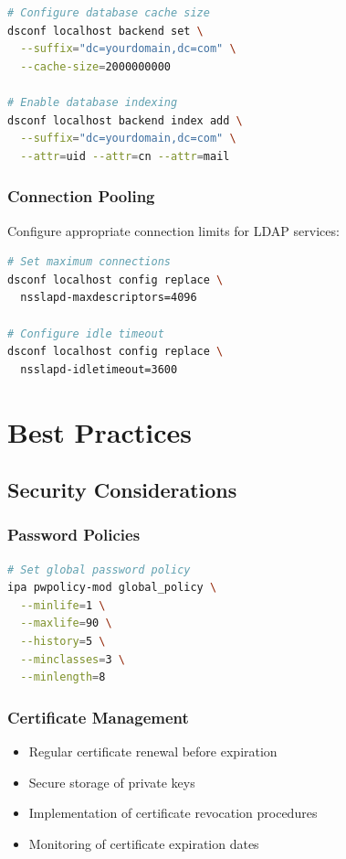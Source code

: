 \documentclass[12pt,a4paper]{report}
\begin{document}
\begin{lstlisting}[language=bash,caption=Database Performance Tuning]
# Configure database cache size
dsconf localhost backend set \
  --suffix="dc=yourdomain,dc=com" \
  --cache-size=2000000000

# Enable database indexing
dsconf localhost backend index add \
  --suffix="dc=yourdomain,dc=com" \
  --attr=uid --attr=cn --attr=mail
\end{lstlisting}

\subsection{Connection Pooling}

Configure appropriate connection limits for LDAP services:

\begin{lstlisting}[language=bash,caption=LDAP Connection Configuration]
# Set maximum connections
dsconf localhost config replace \
  nsslapd-maxdescriptors=4096

# Configure idle timeout
dsconf localhost config replace \
  nsslapd-idletimeout=3600
\end{lstlisting}

\chapter{Best Practices}

\section{Security Considerations}

\subsection{Password Policies}

\begin{lstlisting}[language=bash,caption=Configure Password Policies]
# Set global password policy
ipa pwpolicy-mod global_policy \
  --minlife=1 \
  --maxlife=90 \
  --history=5 \
  --minclasses=3 \
  --minlength=8
\end{lstlisting}

\subsection{Certificate Management}

\begin{itemize}
    \item Regular certificate renewal before expiration
    \item Secure storage of private keys
    \item Implementation of certificate revocation procedures
    \item Monitoring of certificate expiration dates
\end{itemize}
\end{document}

